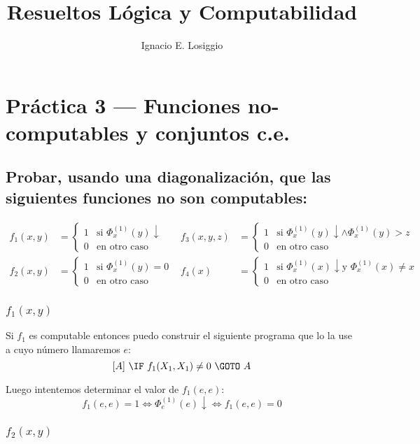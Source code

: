 \documentclass[fleqn, 11pt]{article}
\title{Resueltos Lógica y Computabilidad}
\author{Ignacio E. Losiggio}
\newcommand{\ddef}{\downarrow}
\begin{document}
\maketitle
\section{Práctica 3 --- Funciones no-computables y conjuntos c.e.}

\subsection{Probar, usando una diagonalización, que las siguientes funciones no
son computables:}

\begin{align*}
	f_1(x, y) &=
	\begin{cases}
		1 & \text{si } \Phi^{(1)}_x(y) \ddef \\
		0 & \text{en otro caso}
	\end{cases}
	&f_3(x, y, z) &=
	\begin{cases}
		1 & \text{si } \Phi^{(1)}_x(y) \ddef
		    \land \Phi^{(1)}_x(y) > z \\
		0 & \text{en otro caso}
	\end{cases} \\
	f_2(x, y) &=
	\begin{cases}
		1 & \text{si } \Phi^{(1)}_x(y) = 0 \\
		0 & \text{en otro caso}
	\end{cases}
	&f_4(x) &=
	\begin{cases}
		1 & \text{si } \Phi^{(1)}_x(x) \ddef
		    \text{y } \Phi^{(1)}_x(x) \neq x \\
		0 & \text{en otro caso}
	\end{cases}
\end{align*}

\subsubsection{$f_1(x, y)$}

Si $f_1$ es computable entonces puedo construir el siguiente programa que lo
la use a cuyo número llamaremos $e$:
\[
	[A]\ \IF\ f_1(X_1, X_1) \neq 0\ \GOTO\ A
\]

Luego intentemos determinar el valor de $f_1(e, e)$:
\[
	f_1(e, e) = 1
	\iff \Phi^{(1)}_e(e) \ddef
	\iff f_1(e, e) = 0
\]

\subsubsection{$f_2(x, y)$}
\end{document}
